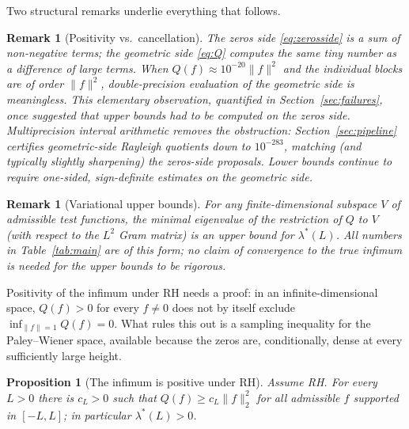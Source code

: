﻿\documentclass[11pt]{article}
\newtheorem{proposition}[theorem]{Proposition}
\newtheorem{remark}[theorem]{Remark}
\newcommand{\lmin}{\lambda^{*}}
\begin{document}
Two structural remarks underlie everything that follows.

\begin{remark}[Positivity vs.\ cancellation]\label{rem:sides}
The zeros side \eqref{eq:zerosside} is a sum of non-negative terms;
the geometric side \eqref{eq:Q} computes the same tiny number as a
difference of large terms.  When $Q(f)\approx10^{-20}\|f\|^2$ and the
individual blocks are of order $\|f\|^2$, double-precision evaluation
of the geometric side is meaningless.  This elementary observation,
quantified in Section~\ref{sec:failures}, once suggested that upper
bounds had to be computed on the zeros side.  Multiprecision interval
arithmetic removes the obstruction: Section~\ref{sec:pipeline}
certifies geometric-side Rayleigh quotients down to
$10^{-283}$, matching (and typically slightly sharpening) the
zeros-side proposals.  Lower bounds continue to require one-sided,
sign-definite estimates on the geometric side.
\end{remark}

\begin{remark}[Variational upper bounds]\label{rem:variational}
For any finite-dimensional subspace $V$ of admissible test functions,
the minimal eigenvalue of the restriction of $Q$ to $V$ (with respect
to the $L^2$ Gram matrix) is an upper bound for $\lmin(L)$.  All
numbers in Table~\ref{tab:main} are of this form; no claim of
convergence to the true infimum is needed for the upper bounds to be
rigorous.
\end{remark}

Positivity of the infimum under RH needs a proof: in an
infinite-dimensional space, $Q(f)>0$ for every $f\ne0$ does not by
itself exclude $\inf_{\|f\|=1}Q(f)=0$.  What rules this out is a
sampling inequality for the Paley--Wiener space, available because the
zeros are, conditionally, dense at every sufficiently large height.

\begin{proposition}[The infimum is positive under RH]\label{prop:positive}
Assume RH.  For every $L>0$ there is $c_L>0$ such that
$Q(f)\ge c_L\|f\|_2^2$ for all admissible $f$ supported in $[-L,L]$;
in particular $\lmin(L)>0$.
\end{proposition}
\end{document}
